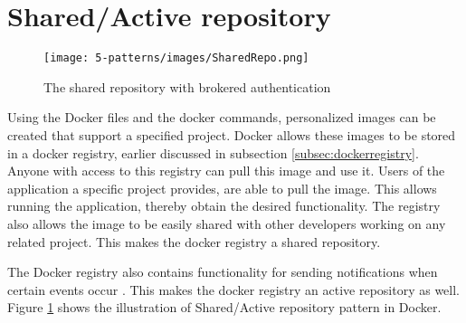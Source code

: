 \section{Shared/Active repository}

\begin{figure}[H]
\centering
\texttt{[image: 5-patterns/images/SharedRepo.png]}
\caption{The shared repository with brokered authentication}
\label{fig:docker-registry}
\end{figure}

Using the Docker files and the docker commands, personalized images can be
created that support a specified project. Docker allows these images to be
stored in a docker registry, earlier discussed in subsection
\ref{subsec:dockerregistry}. Anyone with access to this registry can pull this
image and use it. Users of the application a specific project provides, are able
to pull the image. This allows running the application, thereby obtain the
desired functionality. The registry also allows the image to be easily shared
with other developers working on any related project. This makes the docker
registry a shared repository.




The Docker registry also contains functionality for sending notifications when
certain events occur \cite{docknotif}. This makes the docker registry an active
repository as well. Figure \ref{fig:docker-registry} shows the illustration of
Shared/Active repository pattern in Docker.

